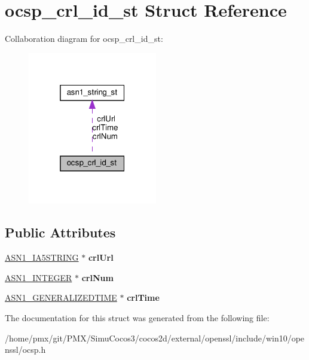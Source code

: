 \hypertarget{structocsp__crl__id__st}{}\section{ocsp\+\_\+crl\+\_\+id\+\_\+st Struct Reference}
\label{structocsp__crl__id__st}


Collaboration diagram for ocsp\+\_\+crl\+\_\+id\+\_\+st\+:
\nopagebreak
\begin{figure}[H]
\begin{center}
\leavevmode
\includegraphics[width=160pt]{structocsp__crl__id__st__coll__graph}
\end{center}
\end{figure}
\subsection*{Public Attributes}
\begin{DoxyCompactItemize}
\item 
\mbox{\label{structocsp__crl__id__st_a1054ab5bca3c14bd95723caf35a02dc7}} 
\hyperlink{structasn1__string__st}{A\+S\+N1\+\_\+\+I\+A5\+S\+T\+R\+I\+NG} $\ast$ {\bfseries crl\+Url}
\item 
\mbox{\label{structocsp__crl__id__st_a65c4311de0c943b5e162c7ce6091b74e}} 
\hyperlink{structasn1__string__st}{A\+S\+N1\+\_\+\+I\+N\+T\+E\+G\+ER} $\ast$ {\bfseries crl\+Num}
\item 
\mbox{\label{structocsp__crl__id__st_ac837981de065fbf9415d54739fedc2f5}} 
\hyperlink{structasn1__string__st}{A\+S\+N1\+\_\+\+G\+E\+N\+E\+R\+A\+L\+I\+Z\+E\+D\+T\+I\+ME} $\ast$ {\bfseries crl\+Time}
\end{DoxyCompactItemize}


The documentation for this struct was generated from the following file\+:\begin{DoxyCompactItemize}
\item 
/home/pmx/git/\+P\+M\+X/\+Simu\+Cocos3/cocos2d/external/openssl/include/win10/openssl/ocsp.\+h\end{DoxyCompactItemize}
